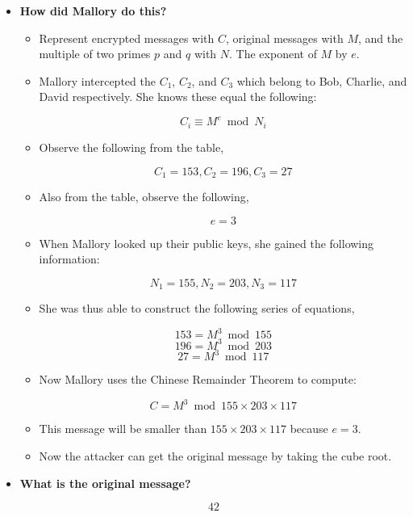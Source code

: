 \documentclass[11pt]{article}
\begin{document}
\begin{itemize}

\item \textbf{How did Mallory do this? }

\begin{itemize}

\item Represent encrypted messages with $C$, original messages with $M$,
and the multiple of two primes $p$ and $q$ with $N$. The exponent of $M$
by $e$.

\item Mallory intercepted the $C_1$, $C_2$, and $C_3$ which belong to Bob,
Charlie, and David respectively. She knows these equal the following:

$$ C_i \equiv M^e \bmod N_i $$

\item Observe the following from the table,

$$ C_1 = 153, C_2 = 196, C_3 = 27 $$

\item Also from the table, observe the following,

$$ e = 3 $$

\item When Mallory looked up their public keys, she gained the following information:

$$ N_1 = 155, N_2 = 203, N_3 = 117 $$

\item She was thus able to construct the following series of equations,

$$ 153 = M^3 \bmod 155 $$
$$ 196 = M^3 \bmod 203 $$
$$ 27 = M^3 \bmod 117 $$

\item Now Mallory uses the Chinese Remainder Theorem to compute:

$$ C = M^3 \bmod 155 \times 203 \times 117 $$

\item This message will be smaller than $155 \times 203 \times 117$ because $e = 3$.

\item Now the attacker can get the original message by taking the cube root.

\end{itemize}

\item \textbf{What is the original message?}

$$ 42 $$

\end{itemize}
\end{document}
